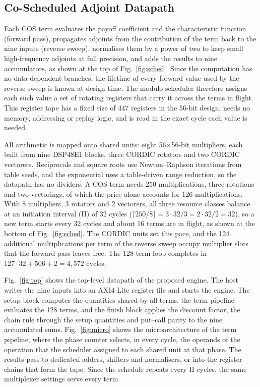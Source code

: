 \documentclass[conference]{IEEEtran}
\begin{document}
\subsection{Co-Scheduled Adjoint Datapath}
Each COS term evaluates the payoff coefficient and the characteristic function (forward pass),
propagates adjoints from the contribution of the term back to the nine inputs (reverse sweep),
normalises them by a power of two to keep small high-frequency adjoints at full precision, and
adds the results to nine accumulators, as shown at the top of Fig.~\ref{fig:sched}. Since the
computation has no data-dependent branches, the lifetime of every forward value used by the
reverse sweep is known at design time. The modulo scheduler therefore assigns each such value a
set of rotating registers that carry it across the terms in flight. This register tape has a fixed
size of 447 registers in the 56-bit design, needs no memory, addressing or replay logic, and is
read in the exact cycle each value is needed.

All arithmetic is mapped onto shared units: eight 56$\times$56-bit multipliers, each built from
nine DSP48E1 blocks, three CORDIC rotators and two CORDIC vectorers. Reciprocals and square roots
use Newton--Raphson iterations from table seeds, and the exponential uses a table-driven range
reduction, so the datapath has no dividers. A COS term needs 250 multiplications, three rotations
and two vectorings, of which the price alone accounts for 126 multiplications. With 8 multipliers,
3 rotators and 2 vectorers, all three resource classes balance at an initiation interval (II) of
32 cycles ($\lceil 250/8\rceil = 3{\cdot}32/3 = 2{\cdot}32/2 = 32$), so a new term starts every 32
cycles and about 16 terms are in flight, as shown at the bottom of Fig.~\ref{fig:sched}. The CORDIC
units set this pace, and the 124 additional multiplications per term of the reverse sweep occupy
multiplier slots that the forward pass leaves free. The 128-term loop completes in
$127\cdot32+506+2=4{,}572$ cycles.

Fig.~\ref{fig:top} shows the top-level datapath of the proposed engine. The host writes the
nine inputs into an AXI4-Lite register file and starts the engine. The setup block computes the
quantities shared by all terms, the term pipeline evaluates the 128 terms, and the finish block
applies the discount factor, the chain rule through the setup quantities and put--call parity to
the nine accumulated sums. Fig.~\ref{fig:micro} shows the microarchitecture of the term pipeline,
where the phase counter selects, in every cycle, the operands of the operation that the scheduler
assigned to each shared unit at that phase. The results pass to dedicated adders, shifters and
normalisers, or into the register chains that form the tape. Since the schedule repeats every II
cycles, the same multiplexer settings serve every term.
\end{document}
